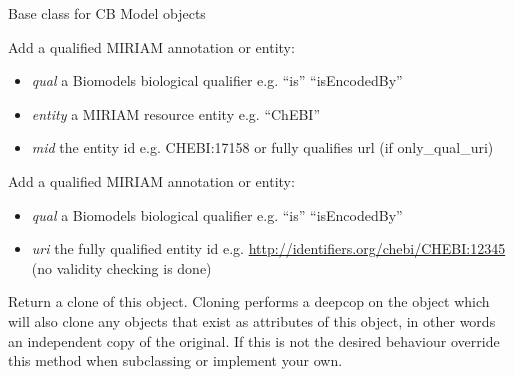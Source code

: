 \documentclass[a4paper,11pt,english]{sphinxmanual}
\begin{document}
\begin{fulllineitems}
\label{modules_doc:cbmpy.CBModel.Fbase}
Base class for CB Model objects

\begin{fulllineitems}
\label{modules_doc:cbmpy.CBModel.Fbase.addMIRIAMannotation}
Add a qualified MIRIAM annotation or entity:
\begin{itemize}
\item {} 
\emph{qual} a Biomodels biological qualifier e.g. ``is'' ``isEncodedBy''

\item {} 
\emph{entity} a MIRIAM resource entity e.g. ``ChEBI''

\item {} 
\emph{mid} the entity id e.g. CHEBI:17158 or fully qualifies url (if only\_qual\_uri)

\end{itemize}

\end{fulllineitems}


\begin{fulllineitems}
\label{modules_doc:cbmpy.CBModel.Fbase.addMIRIAMuri}
Add a qualified MIRIAM annotation or entity:
\begin{itemize}
\item {} 
\emph{qual} a Biomodels biological qualifier e.g. ``is'' ``isEncodedBy''

\item {} 
\emph{uri} the fully qualified entity id e.g. \href{http://identifiers.org/chebi/CHEBI:12345}{http://identifiers.org/chebi/CHEBI:12345} (no validity checking is done)

\end{itemize}

\end{fulllineitems}


\begin{fulllineitems}
\label{modules_doc:cbmpy.CBModel.Fbase.clone}
Return a clone of this object. Cloning performs a deepcop on the object which will also clone
any objects that exist as attributes of this object, in other words an independent copy of the
original. If this is not the desired behaviour override this method when subclassing or implement
your own.


\end{fulllineitems}
\end{fulllineitems}
\end{document}
